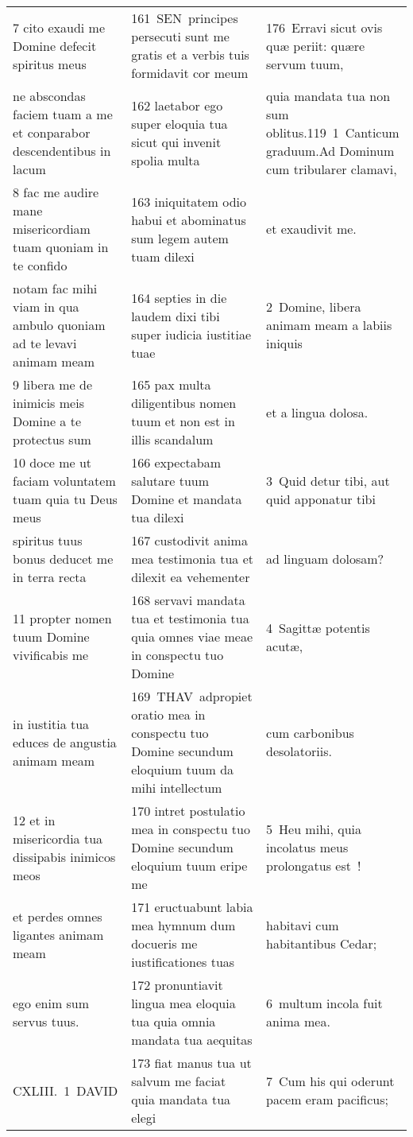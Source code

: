 \documentclass{article}
\begin{document}
\begin{longtable}{@{}p{}p{}p{}@{}}
7 cito exaudi me Domine defecit spiritus meus	&	161 SEN principes persecuti sunt me gratis et a verbis tuis formidavit cor meum	&	176 Erravi sicut ovis quæ periit: quære servum tuum,	\\
ne abscondas faciem tuam a me et conparabor descendentibus in lacum	&	162 laetabor ego super eloquia tua sicut qui invenit spolia multa	&	quia mandata tua non sum oblitus.119 1 Canticum graduum.Ad Dominum cum tribularer clamavi,	\\
8 fac me audire mane misericordiam tuam quoniam in te confido	&	163 iniquitatem odio habui et abominatus sum legem autem tuam dilexi	&	et exaudivit me.	\\
notam fac mihi viam in qua ambulo quoniam ad te levavi animam meam	&	164 septies in die laudem dixi tibi super iudicia iustitiae tuae	&	2 Domine, libera animam meam a labiis iniquis	\\
9 libera me de inimicis meis Domine a te protectus sum	&	165 pax multa diligentibus nomen tuum et non est in illis scandalum	&	et a lingua dolosa.	\\
10 doce me ut faciam voluntatem tuam quia tu Deus meus	&	166 expectabam salutare tuum Domine et mandata tua dilexi	&	3 Quid detur tibi, aut quid apponatur tibi	\\
spiritus tuus bonus deducet me in terra recta	&	167 custodivit anima mea testimonia tua et dilexit ea vehementer	&	ad linguam dolosam?	\\
11 propter nomen tuum Domine vivificabis me	&	168 servavi mandata tua et testimonia tua quia omnes viae meae in conspectu tuo Domine	&	4 Sagittæ potentis acutæ,	\\
in iustitia tua educes de angustia animam meam	&	169 THAV adpropiet oratio mea in conspectu tuo Domine secundum eloquium tuum da mihi intellectum	&	cum carbonibus desolatoriis.	\\
12 et in misericordia tua dissipabis inimicos meos	&	170 intret postulatio mea in conspectu tuo Domine secundum eloquium tuum eripe me	&	5 Heu mihi, quia incolatus meus prolongatus est !	\\
et perdes omnes ligantes animam meam	&	171 eructuabunt labia mea hymnum dum docueris me iustificationes tuas	&	habitavi cum habitantibus Cedar;	\\
ego enim sum servus tuus.	&	172 pronuntiavit lingua mea eloquia tua quia omnia mandata tua aequitas	&	6 multum incola fuit anima mea.	\\
CXLIII. 1 DAVID	&	173 fiat manus tua ut salvum me faciat quia mandata tua elegi	&	7 Cum his qui oderunt pacem eram pacificus;	\\

\end{longtable}
\end{document}
